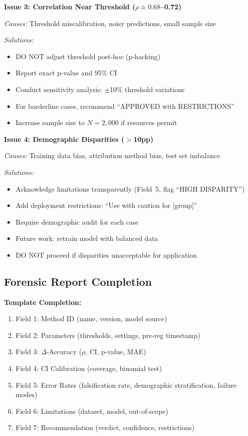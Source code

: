 \textbf{Issue 3: Correlation Near Threshold ($\rho \approx 0.68$--0.72)}

\textit{Causes:} Threshold miscalibration, noisy predictions, small sample size

\textit{Solutions:}
\begin{itemize}
\item DO NOT adjust threshold post-hoc (p-hacking)
\item Report exact p-value and 95\% CI
\item Conduct sensitivity analysis: $\pm$10\% threshold variations
\item For borderline cases, recommend ``APPROVED with RESTRICTIONS''
\item Increase sample size to $N=2,000$ if resources permit
\end{itemize}

\textbf{Issue 4: Demographic Disparities ($>$10pp)}

\textit{Causes:} Training data bias, attribution method bias, test set imbalance

\textit{Solutions:}
\begin{itemize}
\item Acknowledge limitations transparently (Field~5, flag ``HIGH DISPARITY'')
\item Add deployment restrictions: ``Use with caution for [group]''
\item Require demographic audit for each case
\item Future work: retrain model with balanced data
\item DO NOT proceed if disparities unacceptable for application
\end{itemize}

\subsection{Forensic Report Completion}

\textbf{Template Completion:}
\begin{enumerate}
\item Field 1: Method ID (name, version, model source)
\item Field 2: Parameters (thresholds, settings, pre-reg timestamp)
\item Field 3: $\Delta$-Accuracy ($\rho$, CI, p-value, MAE)
\item Field 4: CI Calibration (coverage, binomial test)
\item Field 5: Error Rates (falsification rate, demographic stratification, failure modes)
\item Field 6: Limitations (dataset, model, out-of-scope)
\item Field 7: Recommendation (verdict, confidence, restrictions)
\end{enumerate}

